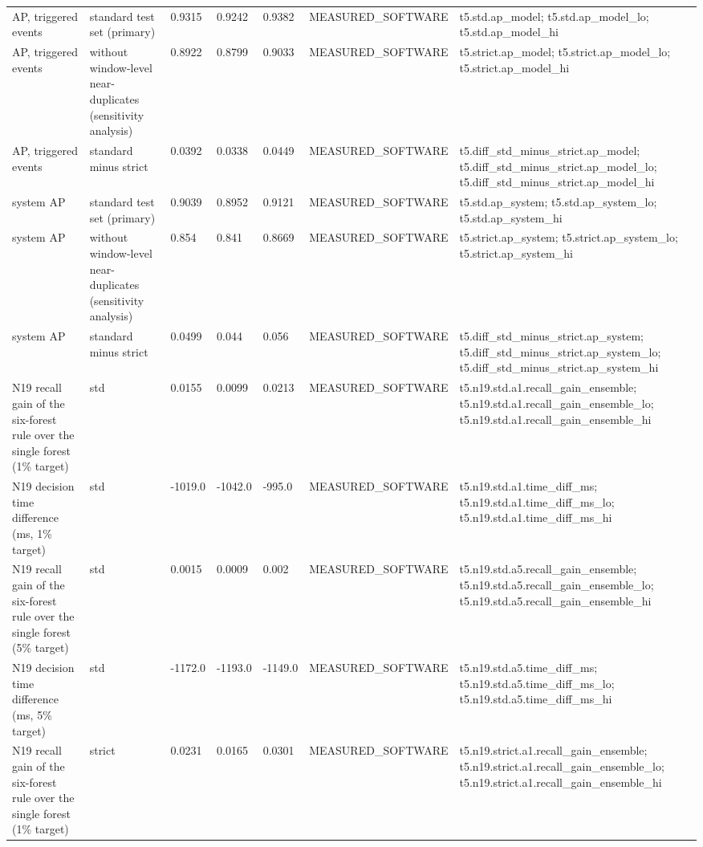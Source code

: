 \begin{table}[t]
\begin{tabular}{lllllll}
AP, triggered events & standard test set (primary) & 0.9315 & 0.9242 & 0.9382 & MEASURED\_SOFTWARE & t5.std.ap\_model; t5.std.ap\_model\_lo; t5.std.ap\_model\_hi \\
AP, triggered events & without window-level near-duplicates (sensitivity analysis) & 0.8922 & 0.8799 & 0.9033 & MEASURED\_SOFTWARE & t5.strict.ap\_model; t5.strict.ap\_model\_lo; t5.strict.ap\_model\_hi \\
AP, triggered events & standard minus strict & 0.0392 & 0.0338 & 0.0449 & MEASURED\_SOFTWARE & t5.diff\_std\_minus\_strict.ap\_model; t5.diff\_std\_minus\_strict.ap\_model\_lo; t5.diff\_std\_minus\_strict.ap\_model\_hi \\
system AP & standard test set (primary) & 0.9039 & 0.8952 & 0.9121 & MEASURED\_SOFTWARE & t5.std.ap\_system; t5.std.ap\_system\_lo; t5.std.ap\_system\_hi \\
system AP & without window-level near-duplicates (sensitivity analysis) & 0.854 & 0.841 & 0.8669 & MEASURED\_SOFTWARE & t5.strict.ap\_system; t5.strict.ap\_system\_lo; t5.strict.ap\_system\_hi \\
system AP & standard minus strict & 0.0499 & 0.044 & 0.056 & MEASURED\_SOFTWARE & t5.diff\_std\_minus\_strict.ap\_system; t5.diff\_std\_minus\_strict.ap\_system\_lo; t5.diff\_std\_minus\_strict.ap\_system\_hi \\
N19 recall gain of the six-forest rule over the single forest (1\% target) & std & 0.0155 & 0.0099 & 0.0213 & MEASURED\_SOFTWARE & t5.n19.std.a1.recall\_gain\_ensemble; t5.n19.std.a1.recall\_gain\_ensemble\_lo; t5.n19.std.a1.recall\_gain\_ensemble\_hi \\
N19 decision time difference (ms, 1\% target) & std & -1019.0 & -1042.0 & -995.0 & MEASURED\_SOFTWARE & t5.n19.std.a1.time\_diff\_ms; t5.n19.std.a1.time\_diff\_ms\_lo; t5.n19.std.a1.time\_diff\_ms\_hi \\
N19 recall gain of the six-forest rule over the single forest (5\% target) & std & 0.0015 & 0.0009 & 0.002 & MEASURED\_SOFTWARE & t5.n19.std.a5.recall\_gain\_ensemble; t5.n19.std.a5.recall\_gain\_ensemble\_lo; t5.n19.std.a5.recall\_gain\_ensemble\_hi \\
N19 decision time difference (ms, 5\% target) & std & -1172.0 & -1193.0 & -1149.0 & MEASURED\_SOFTWARE & t5.n19.std.a5.time\_diff\_ms; t5.n19.std.a5.time\_diff\_ms\_lo; t5.n19.std.a5.time\_diff\_ms\_hi \\
N19 recall gain of the six-forest rule over the single forest (1\% target) & strict & 0.0231 & 0.0165 & 0.0301 & MEASURED\_SOFTWARE & t5.n19.strict.a1.recall\_gain\_ensemble; t5.n19.strict.a1.recall\_gain\_ensemble\_lo; t5.n19.strict.a1.recall\_gain\_ensemble\_hi \\

\end{tabular}
\end{table}
